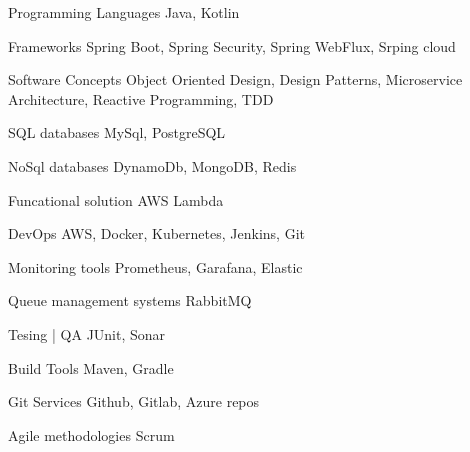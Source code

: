 
\begin{cvskills}

  \cvskill
    {Programming Languages} %
    {Java, Kotlin} %

  \cvskill
    {Frameworks} %
    {Spring Boot, Spring Security, Spring WebFlux, Srping cloud} %

  \cvskill
    {Software Concepts} %
    {Object Oriented Design, Design Patterns, Microservice Architecture, Reactive Programming, TDD} %

  \cvskill
    {SQL databases} %
    {MySql, PostgreSQL} %

  \cvskill
    {NoSql databases} %
    {DynamoDb, MongoDB, Redis} %

  \cvskill
    {Funcational solution} %
    {AWS Lambda} %

  \cvskill
    {DevOps} %
    {AWS, Docker, Kubernetes, Jenkins, Git} %

  \cvskill
    {Monitoring tools} %
    {Prometheus, Garafana, Elastic} %

  \cvskill
    {Queue management systems} %
    {RabbitMQ} %

  \cvskill
    {Tesing | QA} %
    {JUnit, Sonar} %

  \cvskill
    {Build Tools} %
    {Maven, Gradle} %

  \cvskill
    {Git Services} %
    {Github, Gitlab, Azure repos} %

  \cvskill
    {Agile methodologies} %
    {Scrum} %

\end{cvskills}